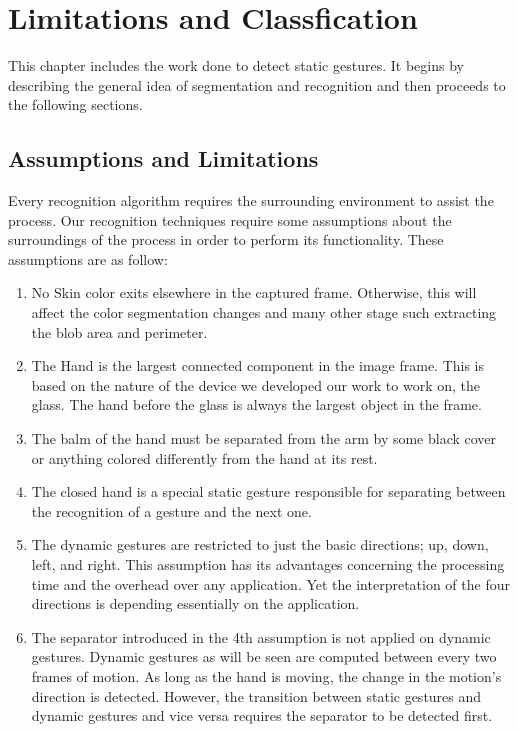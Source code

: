 \chapter{Limitations and Classfication}

This chapter includes the work done to detect static gestures. It begins by describing the general idea of segmentation and recognition and then proceeds to the following sections.\bigskip

\section{Assumptions and Limitations}
Every recognition algorithm requires the surrounding environment to assist the process. Our recognition techniques require some assumptions about the surroundings of the process in order to perform its functionality. These assumptions are as follow:\bigskip

\begin{enumerate}

\item No Skin color exits elsewhere in the captured frame. Otherwise, this will affect the color segmentation changes and many other stage such extracting the blob area and perimeter.

\item The Hand is the largest connected component in the image frame. This is based on the nature of the device we developed our work to work on, the glass. The hand before the glass is always the largest object in the frame. 

\item The balm of the hand must be separated from the arm by some black cover or anything colored differently from the hand at its rest. 

\item The closed hand is a special static gesture responsible for separating between the recognition of a gesture and the next one. 

\item The dynamic gestures are restricted to just the basic directions; up, down, left, and right. This assumption has its advantages concerning the processing time and the overhead over any application. Yet the interpretation of the four directions is depending essentially on the application. 

\item The separator introduced in the 4th assumption is not applied on dynamic gestures. Dynamic gestures as will be seen are computed between every two frames of motion. As long as the hand is moving, the change in the motion's direction is detected. However, the transition between static gestures and dynamic gestures and vice versa requires the separator to be detected first. 
\end{enumerate}
\bigskip

